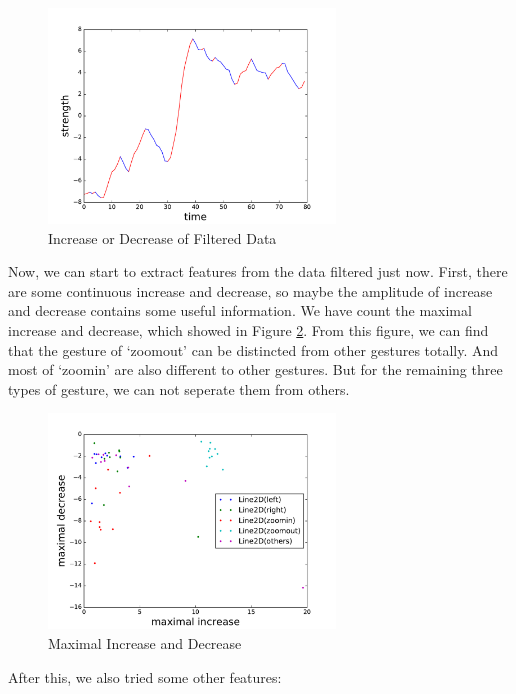 \documentclass[conference]{IEEEtran}
\begin{document}
\begin{figure}[H]
\label{inc-dec-filtered}
\centering
\includegraphics[width=3in]{fs2.pdf}
\caption{Increase or Decrease of Filtered Data}
\end{figure}

Now, we can start to extract features from the data filtered just now. First, there are some continuous increase and decrease, so maybe the amplitude of increase and decrease contains some useful information. We have count the maximal increase and decrease, which showed in Figure \ref{max-inc-dec}. From this figure, we can find that the gesture of `zoomout' can be distincted from other gestures totally. And most of `zoomin' are also different to other gestures. But for the remaining three types of gesture, we can not seperate them from others. 

\begin{figure}[H]
\label{max-inc-dec}
\centering
\includegraphics[width=3in]{fs4.pdf}
\caption{Maximal Increase and Decrease}
\end{figure}

After this, we also tried some other features:
\end{document}
